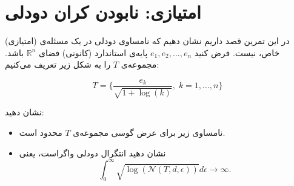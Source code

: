 
\section{امتیازی: نا‌بودن کران دودلی}
(امتیازی) در این تمرین قصد داریم نشان دهیم که نامساوی دودلی در یک مسئله‌ی خاص،
نیست. فرض کنید 
$e_1, e_2, \dots, e_n$
پایه‌ی استاندارد (کانونی) فضای
$\mathbb{R}^n$
باشد. مجموعه‌ی $T$ را به شکل زیر تعریف می‌کنیم:

\begin{equation*}
T = \Big\{\frac{e_k}{\sqrt{1 + \log(k)}}, \; k=1,\dots,n\Big\}
\end{equation*}

نشان دهید:

\begin{itemize}
	\item 
	نامساوی زیر برای عرض گوسی مجموعه‌ی $T$ محدود است.
	\item 
	نشان دهید انتگرال دودلی واگراست، یعنی
	$$\int_{0}^{\infty}\sqrt{\log(\mathcal{N}(T, d, \epsilon))} d\epsilon \to \infty.$$
\end{itemize}
